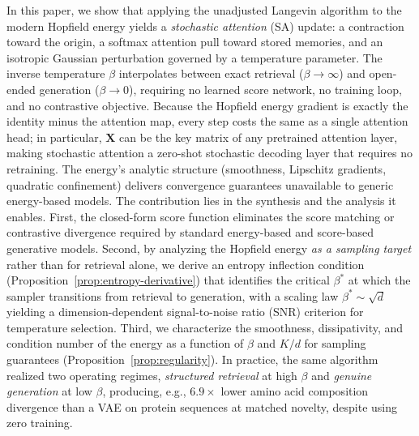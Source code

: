 In this paper, we show that applying the unadjusted Langevin algorithm to the modern Hopfield energy yields a \emph{stochastic attention} (SA) update: a contraction toward the origin, a softmax attention pull toward stored memories, and an isotropic Gaussian perturbation governed by a temperature parameter. The inverse temperature $\beta$ interpolates between exact retrieval ($\beta\to\infty$) and open-ended generation ($\beta\to 0$), requiring no learned score network, no training loop, and no contrastive objective. Because the Hopfield energy gradient is exactly the identity minus the attention map, every step costs the same as a single attention head; in particular, $\mathbf{X}$ can be the key matrix of any pretrained attention layer, making stochastic attention a zero-shot stochastic decoding layer that requires no retraining. The energy's analytic structure (smoothness, Lipschitz gradients, quadratic confinement) delivers convergence guarantees unavailable to generic energy-based models. The contribution lies in the synthesis and the analysis it enables. First, the closed-form score function eliminates the score matching or contrastive divergence required by standard energy-based and score-based generative models. Second, by analyzing the Hopfield energy \emph{as a sampling target} rather than for retrieval alone, we derive an entropy inflection condition (Proposition~\ref{prop:entropy-derivative}) that identifies the critical $\beta^*$ at which the sampler transitions from retrieval to generation, with a scaling law $\beta^*\sim\sqrt{d}$ yielding a dimension-dependent signal-to-noise ratio (SNR) criterion for temperature selection. Third, we characterize the smoothness, dissipativity, and condition number of the energy as a function of $\beta$ and $K/d$ for sampling guarantees (Proposition~\ref{prop:regularity}). In practice, the same algorithm realized two operating regimes, \emph{structured retrieval} at high $\beta$ and \emph{genuine generation} at low $\beta$, producing, e.g., $6.9{\times}$ lower amino acid composition divergence than a VAE on protein sequences at matched novelty, despite using zero training.
